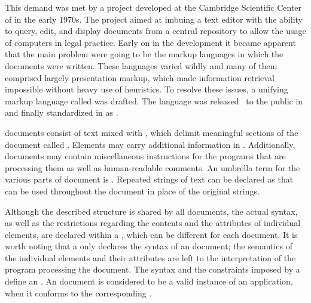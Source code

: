 This demand was met by a project developed at the Cambridge Scientific Center of  in the early 1970s. The
project aimed at imbuing a text editor with the ability to query, edit, and
display documents from a central repository to allow the usage of computers in
legal practice. Early on in the development it became apparent that the
main problem were going to be the markup languages in which the documents were
written. These languages varied wildly and many of them comprised largely
presentation markup, which made information retrieval impossible without heavy
use of heuristics. To resolve these issues, a unifying markup language called
 was drafted. The language was released~\cite{goldfarb81} to the
public in \citeyear{goldfarb81} and finally standardized in \citeyear{iso86} as
.~\cite{iso86}

 documents consist of text mixed with %
, which delimit meaningful sections of the document called
. Elements may carry additional
information in . Additionally,
 documents may contain miscellaneous instructions for the programs
that are processing them as well as human-readable comments. An umbrella term for
the various parts of  document is
. Repeated strings of text can be declared
as   that can be used
throughout the document in place of the original strings. 

Although the described structure is shared by all  documents, the
actual syntax, as well as the restrictions regarding the contents and the
attributes of individual elements, are declared within a , which
can be different for each document. It is worth noting that a  only
declares the syntax of an  document; the semantics of the
individual elements and their attributes are left to the interpretation of the
program processing the document. The syntax and the constraints imposed by a
 define an %
. An  document is considered to be a
valid instance of an  application, when it conforms to the
corresponding .


